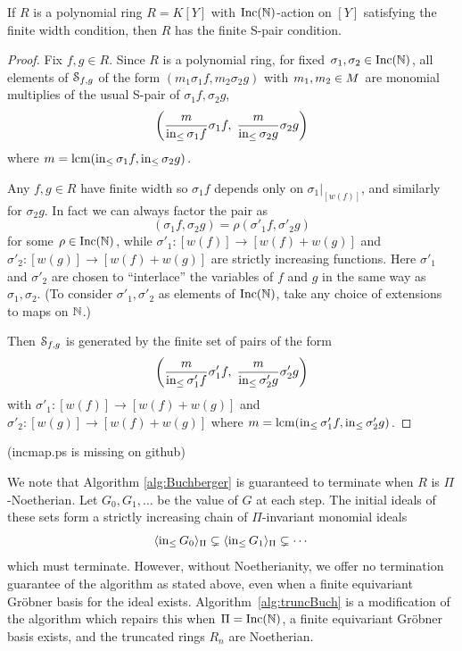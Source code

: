 \begin{proposition}
 If $R$ is a polynomial ring $R = K[Y]$ with $\operatorname{Inc}(\mathbb N)$-action on $[Y]$ satisfying the finite width condition, then $R$ has the finite S-pair condition.
\end{proposition}
\begin{proof}
 Fix $f,g \in R$.
 Since $R$ is a polynomial ring, for fixed $\sigma_1,\sigma_2 \in \operatorname{Inc}(\mathbb N)$, all elements of $\mathcal S_{f,g}$ of the form $(m_1\sigma_1 f, m_2\sigma_2 g)$ with $m_1,m_2 \in M$ are monomial multiplies of the usual S-pair of $\sigma_1 f, \sigma_2 g$,
  \[ \left(\frac{m}{\operatorname{in}_{\leq} \sigma_1 f} \sigma_1 f,\; \frac{m}{\operatorname{in}_{\leq} \sigma_2 g} \sigma_2 g\right) \]
 where $m = \operatorname{lcm}(\operatorname{in}_{\leq} \sigma_1 f,\operatorname{in}_{\leq} \sigma_2 g)$.

 Any $f,g \in R$ have finite width so $\sigma_1 f$ depends only on $\sigma_1|_{[w(f)]}$, and similarly for $\sigma_2 g$.  In fact we can always factor the pair as
  \[ (\sigma_1 f, \sigma_2 g) = \rho(\sigma'_1 f, \sigma'_2 g) \]
 for some $\rho \in \operatorname{Inc}(\mathbb N)$, while $\sigma'_1:[w(f)] \to [w(f) + w(g)]$ and $\sigma'_2:[w(g)] \to [w(f) + w(g)]$ are strictly increasing functions.  Here $\sigma'_1$ and $\sigma'_2$ are chosen to ``interlace'' the variables of $f$ and $g$ in the same way as $\sigma_1,\sigma_2$.  (To consider $\sigma'_1,\sigma'_2$ as elements of $\operatorname{Inc}(\mathbb N)$, take any choice of extensions to maps on $\mathbb N$.)
 
 Then $\mathcal S_{f,g}$ is generated by the finite set of pairs of the form
  \[ \left(\frac{m}{\operatorname{in}_{\leq} \sigma'_1 f} \sigma'_1 f,\; \frac{m}{\operatorname{in}_{\leq} \sigma'_2 g} \sigma'_2 g\right) \]
 with $\sigma'_1:[w(f)] \to [w(f) + w(g)]$ and $\sigma'_2:[w(g)] \to [w(f) + w(g)]$ where $m = \operatorname{lcm}(\operatorname{in}_{\leq} \sigma'_1 f,\operatorname{in}_{\leq} \sigma'_2 g)$.
\end{proof}
{\color{red} (incmap.ps is missing on github)}

We note that Algorithm \ref{alg:Buchberger} is guaranteed to terminate when $R$ is $\Pi$-Noetherian.  Let $G_0,G_1,\ldots$ be the value of $G$ at each step.  The initial ideals of these sets form a strictly increasing chain of $\Pi$-invariant monomial ideals
 \[ \langle \operatorname{in}_{\leq} G_0 \rangle_\Pi \subsetneq \langle \operatorname{in}_{\leq} G_1 \rangle_\Pi \subsetneq \cdots \]
which must terminate.  However, without Noetherianity, we offer no termination guarantee of the algorithm as stated above, even when a finite equivariant Gr\"obner basis for the ideal exists.  Algorithm~\ref{alg:truncBuch} is a modification of the algorithm which repairs this when $\Pi = \operatorname{Inc}(\mathbb N)$, a finite equivariant Gr\"obner basis exists, and the truncated rings $R_n$ are Noetherian.

